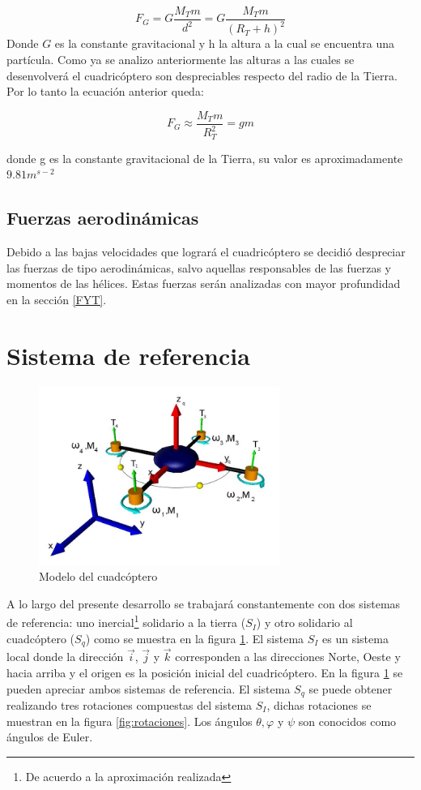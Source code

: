 \documentclass[main]{subfiles}
\begin{document}
\begin{equation}
F_G=G\frac{M_Tm}{d^2}=G\frac{M_Tm}{(R_T+h)^2} 
\end{equation}
Donde $G$ es la constante gravitacional y h la altura a la cual se encuentra una part\'icula.  
Como ya se analizo anteriormente las alturas a las cuales se desenvolver\'a el cuadric\'optero son despreciables respecto del radio de la Tierra. Por lo tanto la ecuaci\'on anterior queda:

\begin{equation}
F_G\approx\frac{M_Tm}{R_T^2}=gm
\end{equation}

donde g es la constante gravitacional de la Tierra, su valor es aproximadamente $9.81m^{s-2}$

\subsection{Fuerzas aerodin\'amicas}
Debido a las bajas velocidades que lograr\'a el cuadric\'optero se decidi\'o despreciar las fuerzas de tipo aerodin\'amicas, salvo aquellas responsables de las fuerzas y momentos de las h\'elices. Estas fuerzas ser\'an analizadas con mayor profundidad en la secci\'on \ref{FYT}.
\section{Sistema de referencia}

\begin{figure}
	\centering
	\includegraphics[width=0.7\textwidth]{./pics_modelo_fisico/quad_coord.jpg}
	\caption{Modelo del cuadc\'optero	}
	\label{fig:quad}
\end{figure}

A lo largo del presente desarrollo se trabajar\'a constantemente con dos sistemas de referencia: uno inercial\footnote{De acuerdo a la aproximaci\'on realizada} solidario a la tierra ($S_I$) y otro solidario al cuadc\'optero ($S_q$) como se muestra en la figura \ref{fig:quad}. El sistema $S_I$ es un sistema local donde la direcci\'on $\vec{i}$, $\vec{j}$ y $\vec{k}$ corresponden a las direcciones Norte, Oeste y hacia arriba y el origen es la posici\'on inicial del cuadric\'optero. En la figura \ref{fig:quad} se pueden apreciar ambos sistemas de referencia.
El sistema $S_q$ se puede obtener realizando tres rotaciones compuestas del sistema $S_I$, dichas rotaciones se muestran en la figura \ref{fig:rotaciones}. Los \'angulos $\theta, \varphi$ y $\psi$ son conocidos como \'angulos de Euler.
\end{document}
